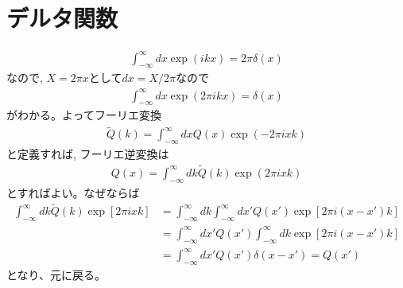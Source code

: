 \documentclass[a4j, 12pt]{ltjarticle}
\begin{document}
    \section{デルタ関数}
    \begin{align}
        \int_{-\infty}^\infty dx \exp\left(ikx\right) = 2\pi\delta(x)
    \end{align}
    なので, $X = 2\pi x$として$dx = X/2\pi$なので
    \begin{align}
        \int_{-\infty}^\infty dx \exp\left(2\pi ikx\right) = \delta(x)
    \end{align}
    がわかる。よってフーリエ変換
    \begin{align}
        \tilde{Q}(k) = \int_{-\infty}^\infty dx Q(x) \exp\left(-2\pi i xk\right)
    \end{align}
    と定義すれば, フーリエ逆変換は
    \begin{align}
        Q(x) = \int_{-\infty}^\infty dk \tilde{Q}(k) \exp\left(2\pi i xk\right)
    \end{align}
    とすればよい。なぜならば
    \begin{align}
        \int_{-\infty}^\infty dk \tilde{Q}(k)
        \exp\left[2\pi ixk\right] &= 
        \int_{-\infty}^\infty dk \int_{-\infty}^\infty dx' Q(x')\exp[2\pi i (x-x')k] \\
        &= \int_{-\infty}^\infty dx' Q(x') \int_{-\infty}^\infty dk \exp[2\pi i(x-x')k] \\
        &= \int_{-\infty}^\infty dx' Q(x') \delta(x-x') = Q(x')        
    \end{align}
    となり、元に戻る。
\end{document}
